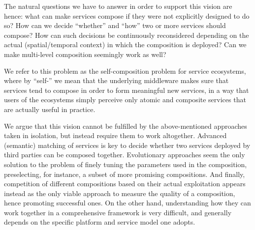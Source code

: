 \documentclass[12pt,a4paper,twoside,openright]{book}
\begin{document}
The natural questions we have to answer in order to support this vision are hence: what can make services compose if they were not explicitly designed to do so?
%
How can we decide ``whether'' and ``how'' two or more services should compose?
%
How can such decisions be continuously reconsidered depending on the actual (spatial/temporal context) in which the composition is deployed?
%
Can we make multi-level composition seemingly work as well?

We refer to this problem as the self-composition problem for service ecosystems, where by ``self-'' we mean that the underlying middleware makes sure that services tend to compose in order to form meaningful new services, in a way that users of the ecosystems simply perceive only atomic and composite services that are actually useful in practice.

We argue that this vision cannot be fulfilled by the above-mentioned approaches taken in isolation, but instead require them to work altogether.
%
Advanced (semantic) matching of services is key to decide whether two services deployed by third parties can be composed together.
%
Evolutionary approaches seem the only solution to the problem of finely tuning the parameters used in the composition, preselecting, for instance, a subset of more promising compositions. 
%
And finally, competition of different compositions based on their actual exploitation appears instead as the only viable approach to measure the quality of a composition, hence promoting successful ones.
%
On the other hand, understanding how they can work together in a comprehensive framework is very difficult, and generally depends on the specific platform and service model one adopts.
\end{document}

